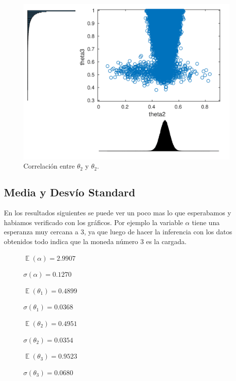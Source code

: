 \begin{figure}[H]
\centering
\begin{minipage}{0.5\textwidth}
	\includegraphics[width=1.0\textwidth]{imgs/theta2_3.png}
	\caption{\footnotesize Correlación entre $\theta_2$ y $\theta_2$.}
\end{minipage}	
\end{figure}


\subsection{Media y Desvío Standard}

En los resultados siguientes se puede ver un poco mas lo que esperabamos y habiamos verificado con los gráficos. Por ejemplo la variable $\alpha$ tiene una esperanza muy cercana a 3, ya que luego de hacer la inferencia con los datos obtenidos todo indica que la moneda número 3 es la cargada.

\begin{figure}[H]
\begin{minipage}{0.5\textwidth}
 \centering

$\mathop{\mathbb{E}} (\alpha) = 2.9907$

$\sigma (\alpha) = 0.1270$

$ \mathop{\mathbb{E}} (\theta_1) = 0.4899 $

$ \sigma (\theta_1) = 0.0368 $


\end{minipage}
\begin{minipage}{0.5\textwidth}
 \centering

$ \mathop{\mathbb{E}} (\theta_2) = 0.4951 $

$ \sigma (\theta_2) = 0.0354 $

$ \mathop{\mathbb{E}} (\theta_3) = 0.9523 $

$ \sigma (\theta_3) = 0.0680 $

\end{minipage}
\end{figure}

